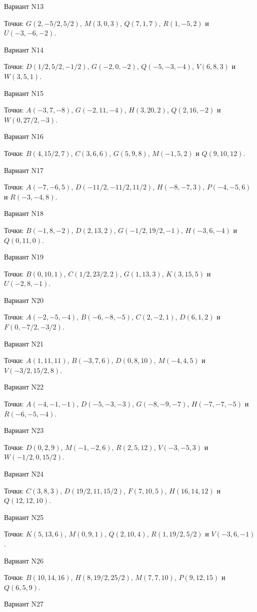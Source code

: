 \documentclass[11pt]{report}
\begin{document}
Вариант N13

Точки: $G(2, -5/2, 5/2)$, $M(3, 0, 3)$, $Q(7, 1, 7)$, $R(1, -5, 2)$ и $U(-3, -6, -2)$.

Вариант N14

Точки: $D(1/2, 5/2, -1/2)$, $G(-2, 0, -2)$, $Q(-5, -3, -4)$, $V(6, 8, 3)$ и $W(3, 5, 1)$.

Вариант N15

Точки: $A(-3, 7, -8)$, $G(-2, 11, -4)$, $H(3, 20, 2)$, $Q(2, 16, -2)$ и $W(0, 27/2, -3)$.

Вариант N16

Точки: $B(4, 15/2, 7)$, $C(3, 6, 6)$, $G(5, 9, 8)$, $M(-1, 5, 2)$ и $Q(9, 10, 12)$.

Вариант N17

Точки: $A(-7, -6, 5)$, $D(-11/2, -11/2, 11/2)$, $H(-8, -7, 3)$, $P(-4, -5, 6)$ и $R(-3, -4, 8)$.

Вариант N18

Точки: $B(-1, 8, -2)$, $D(2, 13, 2)$, $G(-1/2, 19/2, -1)$, $H(-3, 6, -4)$ и $Q(0, 11, 0)$.

Вариант N19

Точки: $B(0, 10, 1)$, $C(1/2, 23/2, 2)$, $G(1, 13, 3)$, $K(3, 15, 5)$ и $U(-2, 8, -1)$.

Вариант N20

Точки: $A(-2, -5, -4)$, $B(-6, -8, -5)$, $C(2, -2, 1)$, $D(6, 1, 2)$ и $F(0, -7/2, -3/2)$.

Вариант N21

Точки: $A(1, 11, 11)$, $B(-3, 7, 6)$, $D(0, 8, 10)$, $M(-4, 4, 5)$ и $V(-3/2, 15/2, 8)$.

Вариант N22

Точки: $A(-4, -1, -1)$, $D(-5, -3, -3)$, $G(-8, -9, -7)$, $H(-7, -7, -5)$ и $R(-6, -5, -4)$.

Вариант N23

Точки: $D(0, 2, 9)$, $M(-1, -2, 6)$, $R(2, 5, 12)$, $V(-3, -5, 3)$ и $W(-1/2, 0, 15/2)$.

Вариант N24

Точки: $C(3, 8, 3)$, $D(19/2, 11, 15/2)$, $F(7, 10, 5)$, $H(16, 14, 12)$ и $Q(12, 12, 10)$.

Вариант N25

Точки: $K(5, 13, 6)$, $M(0, 9, 1)$, $Q(2, 10, 4)$, $R(1, 19/2, 5/2)$ и $V(-3, 6, -1)$.

Вариант N26

Точки: $B(10, 14, 16)$, $H(8, 19/2, 25/2)$, $M(7, 7, 10)$, $P(9, 12, 15)$ и $Q(6, 5, 9)$.

Вариант N27
\end{document}
